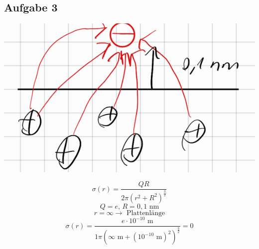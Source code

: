 \documentclass{article}
\begin{document}
\subsection*{Aufgabe 3}
\begin{center}
    \includegraphics{Abbildungen/Abb.2.png}
\end{center}
\begin{equation*}
    \sigma (r) = \frac{QR}{2\pi (r^2+R^2)^{\frac{3}{2}}}
\end{equation*}
\begin{equation*}
    Q = e, \, R=0,1 \text{ nm}
\end{equation*}
\begin{equation*}
    r = \infty \rightarrow \text{ Plattenlänge}
\end{equation*}
\begin{equation*}
    \sigma (r) = \frac{e \cdot 10^{-10} \text{ m}}{1\pi (\infty \text{ m} +(10^{-10}\text{ m})^2)^{\frac{3}{2}}} = 0
\end{equation*}
\end{document}
